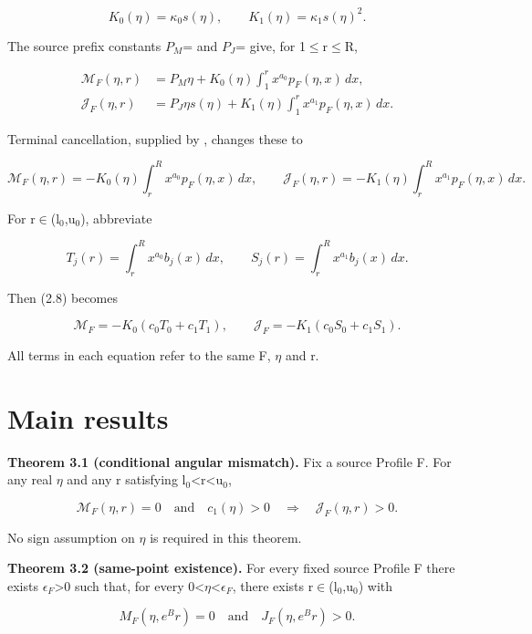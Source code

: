 \documentclass[11pt,a4paper]{article}
\begin{document}
\[
K_0(\eta)=\kappa_0 s(\eta),\qquad K_1(\eta)=\kappa_1 s(\eta)^2.
\]

The source prefix constants \(P_M\)= and \(P_J\)= give, for 1\ensuremath{\le}r\ensuremath{\le}R,

\[
\begin{aligned}
\mathcal M_F(\eta,r)&=P_M\eta+K_0(\eta)\int_1^r x^{a_0}p_F(\eta,x)\,dx,\\
\mathcal J_F(\eta,r)&=P_J\eta s(\eta)+K_1(\eta)\int_1^r x^{a_1}p_F(\eta,x)\,dx.
\end{aligned} \tag{2.7}
\]

Terminal cancellation, supplied by , changes these to

\[
\mathcal M_F(\eta,r)=-K_0(\eta)\int_r^R x^{a_0}p_F(\eta,x)\,dx,\qquad
\mathcal J_F(\eta,r)=-K_1(\eta)\int_r^R x^{a_1}p_F(\eta,x)\,dx. \tag{2.8}
\]

For r\ensuremath{\in}(l\ensuremath{{}_0},u\ensuremath{{}_0}), abbreviate

\[
T_j(r)=\int_r^R x^{a_0}b_j(x)\,dx,\qquad
S_j(r)=\int_r^R x^{a_1}b_j(x)\,dx. \tag{2.9}
\]

Then (2.8) becomes

\[
\mathcal M_F=-K_0(c_0T_0+c_1T_1),\qquad
\mathcal J_F=-K_1(c_0S_0+c_1S_1). \tag{2.10}
\]

All terms in each equation refer to the same F, \ensuremath{\eta} and r.

\section{Main results}

\textbf{Theorem 3.1 (conditional angular mismatch).} Fix a source Profile F. For any real \ensuremath{\eta} and any r satisfying l\ensuremath{{}_0}<r<u\ensuremath{{}_0},

\[
\mathcal M_F(\eta,r)=0\quad\text{and}\quad c_1(\eta)>0
\quad\Longrightarrow\quad\mathcal J_F(\eta,r)>0.
\]

No sign assumption on \ensuremath{\eta} is required in this theorem.

\textbf{Theorem 3.2 (same-point existence).} For every fixed source Profile F there exists \(\epsilon _F\)>0 such that, for every 0<\ensuremath{\eta}<\(\epsilon _F\), there exists r\ensuremath{\in}(l\ensuremath{{}_0},u\ensuremath{{}_0}) with

\[
M_F(\eta,e^B r)=0\quad\text{and}\quad J_F(\eta,e^B r)>0. \tag{3.1}
\]
\end{document}
